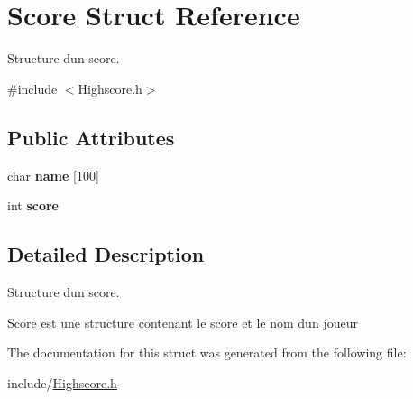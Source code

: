 \hypertarget{struct_score}{}\section{Score Struct Reference}
\label{struct_score}


Structure d\textquotesingle{}un score.  




{\ttfamily \#include $<$Highscore.\+h$>$}

\subsection*{Public Attributes}
\begin{DoxyCompactItemize}
\item 
\mbox{\label{struct_score_ad9ef23be5aaa6db698578803a3b3f4a6}} 
char {\bfseries name} \mbox{[}100\mbox{]}
\item 
\mbox{\label{struct_score_a331b0927105c83ba760954eff6cf9fe9}} 
int {\bfseries score}
\end{DoxyCompactItemize}


\subsection{Detailed Description}
Structure d\textquotesingle{}un score. 

\hyperlink{struct_score}{Score} est une structure contenant le score et le nom d\textquotesingle{}un joueur 

The documentation for this struct was generated from the following file\+:\begin{DoxyCompactItemize}
\item 
include/\hyperlink{_highscore_8h}{Highscore.\+h}\end{DoxyCompactItemize}
